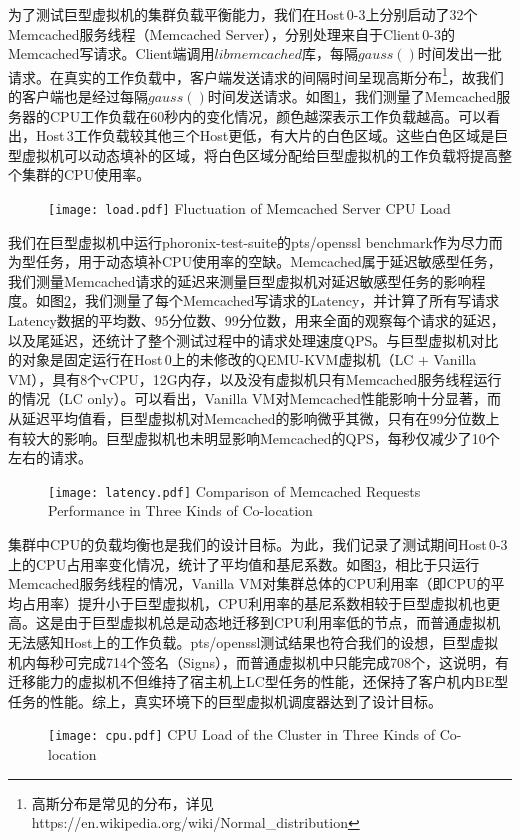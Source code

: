 为了测试巨型虚拟机的集群负载平衡能力，我们在Host\,0-3上分别启动了32个Memcached\cite{memcached}服务线程（Memcached Server），分别处理来自于Client\,0-3的Memcached写请求。Client端调用$libmemcached$库，每隔$gauss()$时间发出一批请求。在真实的工作负载中，客户端发送请求的间隔时间呈现高斯分布\footnote{高斯分布是常见的分布，详见https://en.wikipedia.org/wiki/Normal\_distribution}，故我们的客户端也是经过每隔$gauss()$时间发送请求。如图\ref{fig:load}，我们测量了Memcached服务器的CPU工作负载在60秒内的变化情况，颜色越深表示工作负载越高。可以看出，Host\,3工作负载较其他三个Host更低，有大片的白色区域。这些白色区域是巨型虚拟机可以动态填补的区域，将白色区域分配给巨型虚拟机的工作负载将提高整个集群的CPU使用率。

\begin{figure}[!htp]
  \centering
  \texttt{[image: load.pdf]}
    {Fluctuation of Memcached Server CPU Load}
  \label{fig:load}
\end{figure}

我们在巨型虚拟机中运行phoronix-test-suite\cite{phoronix}的pts/openssl benchmark作为尽力而为型任务，用于动态填补CPU使用率的空缺。Memcached属于延迟敏感型任务，我们测量Memcached请求的延迟来测量巨型虚拟机对延迟敏感型任务的影响程度。如图\ref{fig:latency}，我们测量了每个Memcached写请求的Latency，并计算了所有写请求Latency数据的平均数、95分位数、99分位数，用来全面的观察每个请求的延迟，以及尾延迟，还统计了整个测试过程中的请求处理速度QPS。与巨型虚拟机对比的对象是固定运行在Host\,0上的未修改的QEMU-KVM虚拟机（LC + Vanilla VM），具有8个vCPU，12G内存，以及没有虚拟机只有Memcached服务线程运行的情况（LC only）。可以看出，Vanilla VM对Memcached性能影响十分显著，而从延迟平均值看，巨型虚拟机对Memcached的影响微乎其微，只有在99分位数上有较大的影响。巨型虚拟机也未明显影响Memcached的QPS，每秒仅减少了10个左右的请求。

\begin{figure}[!htp]
  \centering
  \texttt{[image: latency.pdf]}
    {Comparison of Memcached Requests Performance in Three Kinds of Co-location}
  \label{fig:latency}
\end{figure}
集群中CPU的负载均衡也是我们的设计目标。为此，我们记录了测试期间Host\,0-3上的CPU占用率变化情况，统计了平均值和基尼系数。如图\ref{fig:cpuload}，相比于只运行Memcached服务线程的情况，Vanilla VM对集群总体的CPU利用率（即CPU的平均占用率）提升小于巨型虚拟机，CPU利用率的基尼系数相较于巨型虚拟机也更高。这是由于巨型虚拟机总是动态地迁移到CPU利用率低的节点，而普通虚拟机无法感知Host上的工作负载。pts/openssl测试结果也符合我们的设想，巨型虚拟机内每秒可完成714个签名（Signs），而普通虚拟机中只能完成708个，这说明，有迁移能力的虚拟机不但维持了宿主机上LC型任务的性能，还保持了客户机内BE型任务的性能。综上，真实环境下的巨型虚拟机调度器达到了设计目标。
\begin{figure}[!htp]
  \centering
  \texttt{[image: cpu.pdf]}
    {CPU Load of the Cluster in Three Kinds of Co-location}
  \label{fig:cpuload}
\end{figure}


